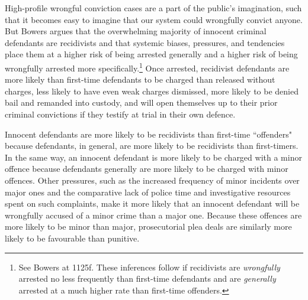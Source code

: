 High-profile wrongful conviction cases are a part of the public's imagination, such that it becomes easy to imagine that our system could wrongfully convict anyone. But Bowers argues that the overwhelming majority of innocent criminal defendants are recidivists and that systemic biases, pressures, and tendencies place them at a higher risk of being arrested generally and a higher risk of being wrongfully arrested more specifically.\footnote{See Bowers at 1125f. These inferences follow if recidivists are \textit{wrongfully} arrested no less frequently than first-time defendants and are \textit{generally} arrested at a much higher rate than first-time offenders.} Once arrested, recidivist defendants are more likely than first-time defendants to be charged than released without charges, less likely to have even weak charges dismissed, more likely to be denied bail and remanded into custody, and will open themselves up to their prior criminal convictions if they testify at trial in their own defence. 

Innocent defendants are more likely to be recidivists than first-time ``offenders" because defendants, in general, are more likely to be recidivists than first-timers. In the same way, an innocent defendant is more likely to be charged with a minor offence because defendants generally are more likely to be charged with minor offences. Other pressures, such as the increased frequency of minor incidents over major ones and the comparative lack of police time and investigative resources spent on such complaints, make it more likely that an innocent defendant will be wrongfully accused of a minor crime than a major one. Because these offences are more likely to be minor than major, prosecutorial plea deals are similarly more likely to be favourable than punitive.

